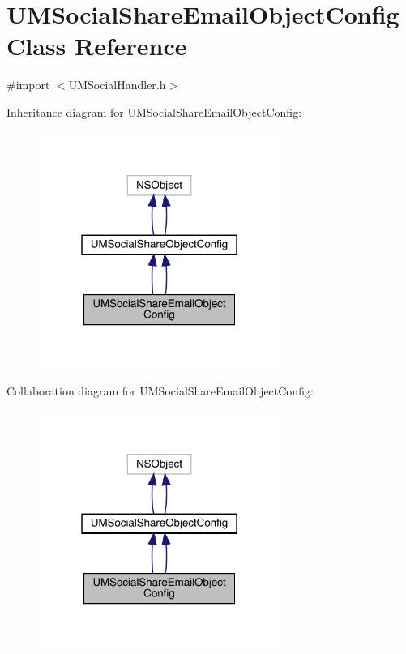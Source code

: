 \hypertarget{interface_u_m_social_share_email_object_config}{}\section{U\+M\+Social\+Share\+Email\+Object\+Config Class Reference}
\label{interface_u_m_social_share_email_object_config}


{\ttfamily \#import $<$U\+M\+Social\+Handler.\+h$>$}



Inheritance diagram for U\+M\+Social\+Share\+Email\+Object\+Config\+:\nopagebreak
\begin{figure}[H]
\begin{center}
\leavevmode
\includegraphics[width=223pt]{interface_u_m_social_share_email_object_config__inherit__graph}
\end{center}
\end{figure}


Collaboration diagram for U\+M\+Social\+Share\+Email\+Object\+Config\+:\nopagebreak
\begin{figure}[H]
\begin{center}
\leavevmode
\includegraphics[width=223pt]{interface_u_m_social_share_email_object_config__coll__graph}
\end{center}
\end{figure}
